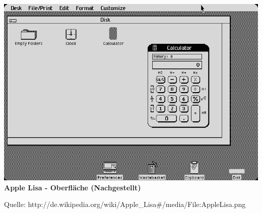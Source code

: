 \documentclass[12pt,a4paper]{report}
\begin{document}
\begin{onehalfspace}
\begin{center}
\includegraphics[scale=0.6]{../docs/lyaton/graphics/Apple-Lisa.png}\\
\textbf{Apple Lisa - Oberfläche (Nachgestellt)}\\
\begin{scriptsize}
Quelle: http://de.wikipedia.org/wiki/Apple\_Lisa\#/media/File:AppleLisa.png
\end{scriptsize}
\end{center}


\end{onehalfspace}
\end{document}
